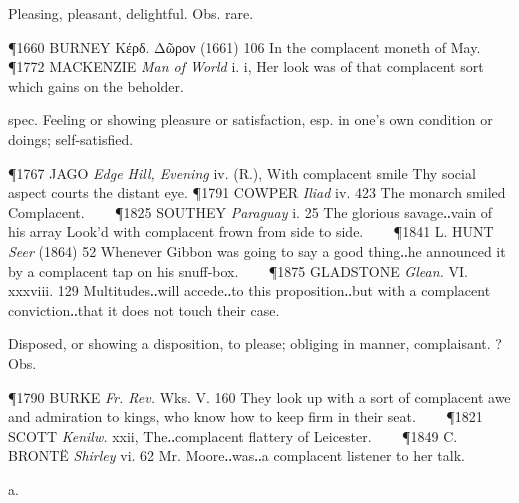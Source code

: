 \begin{description}[wide, labelwidth=!, labelindent=0pt]
\begin{myenumerate}

 Pleasing, pleasant, delightful. Obs. rare.

\P 1660 BURNEY  Κέρδ. Δῶρον (1661) 106 In the complacent moneth of May.    
\P 1772 MACKENZIE  \textit{Man of World} i. i, Her look was of that complacent sort which gains on the beholder.

 spec. Feeling or showing pleasure or satisfaction, esp. in one's own condition or doings; self-satisfied.

\P 1767 JAGO  \textit{Edge Hill, Evening} iv. (R.), With complacent smile Thy social aspect courts the distant eye.
\P 1791 COWPER  \textit{Iliad} iv. 423 The monarch smiled Complacent.    
\P 1825 SOUTHEY  \textit{Paraguay} i. 25 The glorious savage‥vain of his array Look'd with complacent frown from side to side.    
\P 1841 L. HUNT  \textit{Seer} (1864) 52 Whenever Gibbon was going to say a good thing‥he announced it by a complacent tap on his snuff-box.    
\P 1875 GLADSTONE  \textit{Glean.} VI. xxxviii. 129 Multitudes‥will accede‥to this proposition‥but with a complacent conviction‥that it does not touch their case.

 Disposed, or showing a disposition, to please; obliging in manner, complaisant. ? Obs.

\P 1790 BURKE  \textit{Fr. Rev.} Wks. V. 160 They look up with a sort of complacent awe and admiration to kings, who know how to keep firm in their seat.    
\P 1821 SCOTT  \textit{Kenilw.} xxii, The‥complacent flattery of Leicester.    
\P 1849 C. BRONTË  \textit{Shirley} vi. 62 Mr. Moore‥was‥a complacent listener to her talk.
\end{myenumerate}


 a.

\noindent {}

\vspace{-0.3cm}


\end{description}
